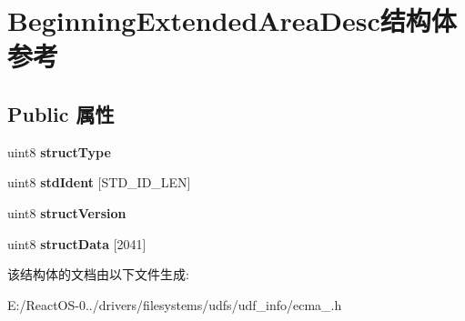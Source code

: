 \hypertarget{struct_beginning_extended_area_desc}{}\section{Beginning\+Extended\+Area\+Desc结构体 参考}
\label{struct_beginning_extended_area_desc}
\subsection*{Public 属性}
\begin{DoxyCompactItemize}
\item 
\mbox{\label{struct_beginning_extended_area_desc_a0319352a2c07f0bfbc0dc90b0a9d8d08}} 
uint8 {\bfseries struct\+Type}
\item 
\mbox{\label{struct_beginning_extended_area_desc_a2dfb7e6248462213b469162b092d1006}} 
uint8 {\bfseries std\+Ident} \mbox{[}S\+T\+D\+\_\+\+I\+D\+\_\+\+L\+EN\mbox{]}
\item 
\mbox{\label{struct_beginning_extended_area_desc_aa6052adc1b37a026d6fb4b4f72dbdc44}} 
uint8 {\bfseries struct\+Version}
\item 
\mbox{\label{struct_beginning_extended_area_desc_a13fe00d6daba2e7bcaffebd9d1180a90}} 
uint8 {\bfseries struct\+Data} \mbox{[}2041\mbox{]}
\end{DoxyCompactItemize}


该结构体的文档由以下文件生成\+:\begin{DoxyCompactItemize}
\item 
E\+:/\+React\+O\+S-\/0../drivers/filesystems/udfs/udf\+\_\+info/ecma\+\_.\+h\end{DoxyCompactItemize}
